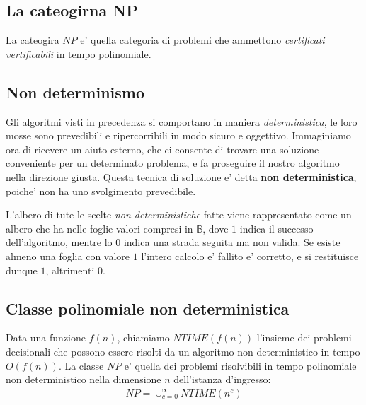 \documentclass{article}
\begin{document}
\subsection{La cateogirna NP}

La cateogira $NP$ e' quella categoria di problemi che ammettono \emph{certificati
vertificabili} in tempo polinomiale.

\subsection{Non determinismo}

Gli algoritmi visti in precedenza si comportano in maniera \emph{deterministica},
le loro mosse sono prevedibili e ripercorribili in modo sicuro e oggettivo. Immaginiamo
ora di ricevere un aiuto esterno, che ci consente di trovare una soluzione conveniente
per un determinato problema, e fa proseguire il nostro algoritmo nella direzione giusta.
Questa tecnica di soluzione e' detta \textbf{non deterministica}, poiche' non
ha uno svolgimento prevedibile.

L'albero di tute le scelte \emph{non deterministiche} fatte viene rappresentato
come un albero che ha nelle foglie valori compresi in $\mathbb{B}$, dove $1$ indica
il successo dell'algoritmo, mentre lo $0$ indica una strada seguita ma non valida.
Se esiste almeno una foglia con valore $1$ l'intero calcolo e' fallito e' corretto,
e si restituisce dunque $1$, altrimenti $0$.

\subsection{Classe polinomiale non deterministica}

Data una funzione $f(n)$, chiamiamo $NTIME(f(n))$ l'insieme dei problemi decisionali
che possono essere risolti da un algoritmo non deterministico in tempo $O(f(n))$.
La classe $NP$ e' quella dei problemi risolvibili in tempo polinomiale non
deterministico nella dimensione $n$ dell'istanza d'ingresso:
\begin{align*}
  NP = \cup^{\infty}_{c=0} NTIME(n^c)
\end{align*}
\end{document}
